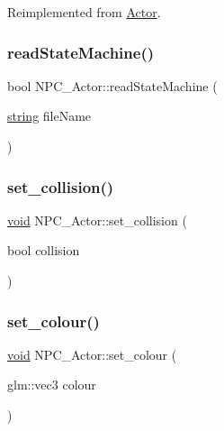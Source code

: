 Reimplemented from \hyperlink{classActor_a47101d6275509662bf6c84c3f3439696}{Actor}.

\mbox{\label{classNPC__Actor_a3a5bc6ab5362520a4d919ca99b31f51b}} 
\subsubsection{\texorpdfstring{read\+State\+Machine()}{readStateMachine()}}
{\footnotesize\ttfamily bool N\+P\+C\+\_\+\+Actor\+::read\+State\+Machine (\begin{DoxyParamCaption}\item[{\hyperlink{imgui__impl__opengl3__loader_8h_ac83513893df92266f79a515488701770}{string}}]{file\+Name }\end{DoxyParamCaption})\hspace{0.3cm}{\ttfamily [inline]}}

\mbox{\label{classNPC__Actor_a7c380c28c883a0823d772f2b91934185}} 
\subsubsection{\texorpdfstring{set\+\_\+collision()}{set\_collision()}}
{\footnotesize\ttfamily \hyperlink{imgui__impl__opengl3__loader_8h_ac668e7cffd9e2e9cfee428b9b2f34fa7}{void} N\+P\+C\+\_\+\+Actor\+::set\+\_\+collision (\begin{DoxyParamCaption}\item[{bool}]{collision }\end{DoxyParamCaption})\hspace{0.3cm}{\ttfamily [inline]}}

\mbox{\label{classNPC__Actor_aaf0be3c75aa294c15f999c2398412d5e}} 
\subsubsection{\texorpdfstring{set\+\_\+colour()}{set\_colour()}}
{\footnotesize\ttfamily \hyperlink{imgui__impl__opengl3__loader_8h_ac668e7cffd9e2e9cfee428b9b2f34fa7}{void} N\+P\+C\+\_\+\+Actor\+::set\+\_\+colour (\begin{DoxyParamCaption}\item[{glm\+::vec3}]{colour }\end{DoxyParamCaption})\hspace{0.3cm}{\ttfamily [inline]}}

